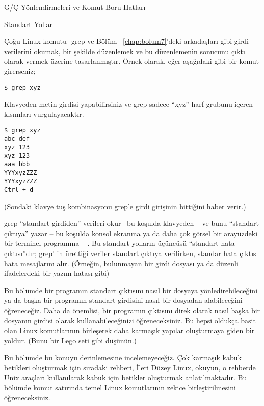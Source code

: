 \begin{section}{G/Ç Yönlendirmeleri ve Komut Boru Hatları}
\begin{subsection}{Standart Yollar}

Çoğu Linux komutu -grep ve Bölüm ~\ref{chap:bolum7}'deki arkadaşları gibi girdi verilerini okumak, bir şekilde düzenlemek ve bu düzenlemenin sonucunu çıktı olarak vermek üzerine tasarlanmıştır. Örnek olarak, eğer aşağıdaki gibi bir komut girerseniz;

\footnotesize
\begin{verbatim}
$ grep xyz
\end{verbatim}
\normalsize

Klavyeden metin girdisi yapabilirsiniz ve grep sadece “xyz” harf grubunu içeren kısımları vurgulayacaktır.
\footnotesize
\begin{verbatim}
$ grep xyz 
abc def 
xyz 123 
xyz 123 
aaa bbb 
YYYxyzZZZ 
YYYxyzZZZ 
Ctrl + d
\end{verbatim}
\normalsize
(Sondaki klavye tuş kombinasyonu grep'e girdi girişinin bittiğini haber verir.)

grep “standart girdiden” verileri okur –bu koşulda klavyeden – ve bunu “standart çıktıya” yazar – bu koşulda konsol ekranına ya da daha çok görsel bir arayüzdeki bir terminel programına – . Bu standart yolların üçüncüsü “standart hata çıktısı”dır; grep' in ürettiği veriler standart çıktıya verilirken, standar hata çıktısı hata mesajlarını alır. (Örneğin, bulunmayan bir girdi dosyası ya da düzenli ifadelerdeki bir yazım hatası gibi)

Bu bölümde bir programın standart çıktısını nasıl bir dosyaya yönledirebileceğini ya da başka bir programın standart girdisini nasıl bir dosyadan alabileceğini öğreneceğiz. Daha da önemlisi, bir programın çıktısını direk olarak nasıl başka bir dosyanın girdisi olarak kullanabileceğinizi öğreneceksiniz.  Bu hepsi oldukça basit olan Linux komutlarının birleşerek daha karmaşık yapılar oluşturmaya giden bir yoldur. (Bunu bir Lego seti gibi düşünün.)

Bu bölümde bu konuyu derinlemesine incelemeyeceğiz. Çok karmaşık kabuk betikleri oluşturmak için sıradaki rehberi, İleri Düzey Linux, okuyun, o rehberde Unix araçları kullanılarak kabuk için betikler oluşturmak anlatılmaktadır. Bu bölümde komut satırında temel Linux komutlarının zekice birleştirilmesini öğreneceksiniz. 


\end{subsection}
\end{section}
